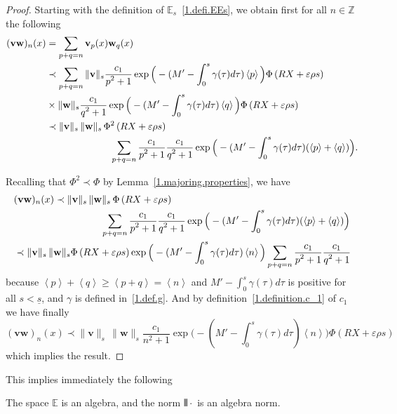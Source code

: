 \documentclass[AHL,Unicode,longabstracts,published]{cedram}
\theoremstyle{plain}
\newcommand*\e{\varepsilon}
\newcommand*\Z{{\mathbb Z}}
\newcommand*\EE{{\mathbb E}}
\newcommand*\g{\gamma}
\newcommand{\vbf}{{\mathbf v}}
\newcommand*\w{{\mathbf w}}
\newcommand*\und{\underline}
\DeclarePairedDelimiter{\VERT}{|\mkern -1.6mu|\mkern -1.6mu|}{|\mkern -1.6mu|\mkern -1.6mu|}
\begin{document}
\begin{proof}
Starting with the definition of $\EE_{s}$~\eqref{1.defi.EEs}, we obtain first for all $n\in\Z$ the following
\begin{align*}
(\vbf \w)_{n}(x) &= \sum_{p+q=n} \vbf_p(x) \w_q(x) \\
 &\prec \sum_{p+q=n}
 \|\vbf\|_{s} \frac{\displaystyle c_1}{\displaystyle p^2+1}\exp\Big({}-(M' - \int_{0}^{s} \g(\tau) d\tau)\left< p \right>\Big) \Phi\left(R X+\e\rho s\right) \\
&\times \|\w\|_{s} \frac{\displaystyle c_1}{\displaystyle q^2+1}\exp\Big({}-(M' - \int_{0}^{s} \g(\tau) d\tau)\left< q \right>\Big) \Phi\left(R X+\e\rho s\right)
 \\
 &\prec \|\vbf\|_{s} \, \|\w\|_{s}\,\Phi^2\left(R X+\e\rho s\right) \\
&\mkern120 mu \sum_{p+q=n} \frac{\displaystyle c_1}{\displaystyle p^2+1}\frac{\displaystyle c_1}{\displaystyle q^2+1}\exp\Big({}-(M' - \int_{0}^{s} \g(\tau) d\tau)(\left< p \right>+\left< q \right>)\Big).
\end{align*}

Recalling that $\Phi^2 \prec \Phi$ by Lemma~\ref{1.majoring.properties}, we have
\begin{align*}
&(\vbf \w)_{n}(x) \prec \|\vbf\|_{s} \, \|\w\|_{s}\,\Phi\left(R X+\e\rho s\right)\\
&\mkern 160mu \sum_{p+q=n} \frac{\displaystyle c_1}{\displaystyle p^2+1}\frac{\displaystyle c_1}{\displaystyle q^2+1}\exp\Big({}-(M' - \int_{0}^{s} \g(\tau) d\tau)(\left< p \right>+\left< q \right>)\Big) \\
& \prec \|\vbf\|_{s} \, \|\w\|_{s} \Phi\left(R X+\e\rho s\right) \exp\Big({}-(M' - \int_{0}^{s} \g(\tau) d\tau)\left< n \right>\Big) \sum_{p+q=n} \frac{\displaystyle c_1}{\displaystyle p^2+1}\frac{\displaystyle c_1}{\displaystyle q^2+1}
\end{align*}
because $\left< p \right>+\left< q \right> \geq \left< p+q\right> = \left<n\right>$ and $ M' - \int_{0}^{s} \g(\tau) d\tau $ is positive for all $s < \und{s}$, and $\g$ is defined in~\eqref{1.def.g}. And by definition~\eqref{1.definition.c_1} of $c_1$ we have finally
\[
(\vbf \w)_{n}(x) \prec \|\vbf\|_{s} \, \|\w\|_{s}\frac{\displaystyle c_1}{\displaystyle n^2+1}\exp\Big({}-(M' - \int_{0}^{s} \g(\tau) d\tau)\left< n \right>\Big) \Phi\left(R X+\e\rho s\right)
\]
which implies the result.
\end{proof}
\goodbreak
This implies immediately the following

\begin{coro}\label{1.coro.algebra}
The space $\EE$ is an algebra, and the norm $\VERT{\cdot}$ is an algebra norm.
\end{coro}
\end{document}
